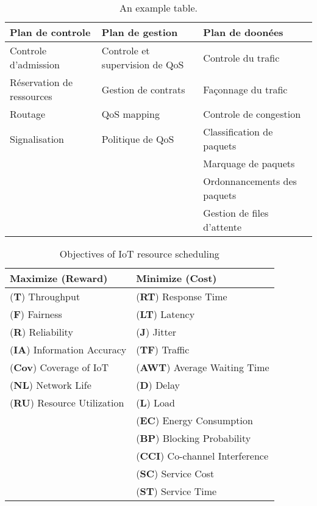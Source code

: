 \begin{table}[h!]
\scriptsize
	\begin{tabulary}{\textwidth}{L|L|L}
		\textbf{Plan de controle}   & \textbf{Plan de gestion}   & 	\textbf{Plan de doonées}  \\\hline
	Controle d'admission      & Controle et supervision de QoS & Controle du trafic         \\
	Réservation de ressources & Gestion de contrats            & Façonnage du trafic        \\
	Routage                   & QoS mapping                    & Controle de congestion     \\
	Signalisation             & Politique de QoS               & Classification de paquets  \\
	\                         &                                & Marquage de paquets        \\
	\                         &                                & Ordonnancements des paquets\\
	\                         &                                & Gestion de files d'attente \\
	\end{tabulary}
	\caption{\label{tab:qos} An example table.}
\end{table}

\begin{table}[h!]
	\begin{tabulary}{\textwidth}{L|L}
	\textbf{Maximize (Reward)}         & \textbf{Minimize (Cost)}             \\\hline
	(\textbf{T}) Throughput            & (\textbf{RT}) Response Time            \\
	(\textbf{F}) Fairness              & (\textbf{LT}) Latency                  \\
	(\textbf{R}) Reliability           & (\textbf{J}) Jitter                    \\
	(\textbf{IA}) Information Accuracy & (\textbf{TF})  Traffic                 \\
	(\textbf{Cov}) Coverage of IoT     & (\textbf{AWT}) Average Waiting Time    \\
	(\textbf{NL}) Network Life         & (\textbf{D})  Delay                    \\
	(\textbf{RU}) Resource Utilization & (\textbf{L}) Load                      \\
	\                         & (\textbf{EC}) Energy Consumption       \\
	\                         & (\textbf{BP})  Blocking Probability    \\
	\                         & (\textbf{CCI})  Co-channel Interference\\
	\                         & (\textbf{SC}) Service Cost             \\
	\                         & (\textbf{ST})   Service Time           \\
	\end{tabulary}
\caption{\label{tab:scheduling} Objectives of IoT resource scheduling}
\end{table}

